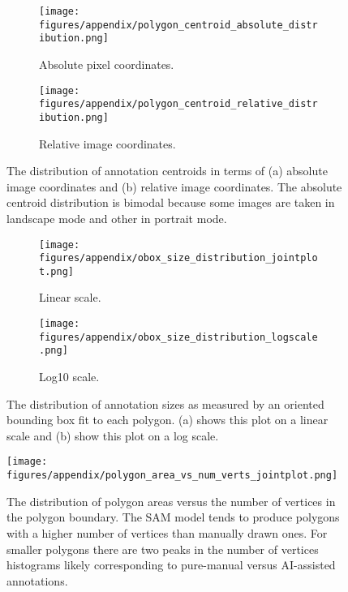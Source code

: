 \begin{figure}[ht]
\centering
\begin{subfigure}[b]{0.4\textwidth}
 \texttt{[image: figures/appendix/polygon\_centroid\_absolute\_distribution.png]}
 \caption{Absolute pixel coordinates.}
 \label{fig:centroid_abs}
\end{subfigure}
\hfill
\begin{subfigure}[b]{0.4\textwidth}
 \texttt{[image: figures/appendix/polygon\_centroid\_relative\_distribution.png]}
 \caption{Relative image coordinates.}
 \label{fig:centroid_rel}
\end{subfigure}
\caption{The distribution of annotation centroids in terms of (a) absolute image coordinates and (b) relative image coordinates. The absolute centroid distribution is bimodal because some images are taken in landscape mode and other in portrait mode.}
\label{fig:centroid_location_distri}
\end{figure}


\begin{figure}[ht]
\centering
\begin{subfigure}[b]{0.4\textwidth}
  \texttt{[image: figures/appendix/obox\_size\_distribution\_jointplot.png]}
  \caption{Linear scale.}
  \label{fig:annot_obox_size_dist_linear}
\end{subfigure}
\hfill
\begin{subfigure}[b]{0.4\textwidth}
  \texttt{[image: figures/appendix/obox\_size\_distribution\_logscale.png]}
  \caption{Log10 scale.}
  \label{fig:annot_obox_size_dist_log}
\end{subfigure}
\caption{The distribution of annotation sizes as measured by an oriented bounding box fit to each polygon. (a) shows this plot on a linear scale and (b) show this plot on a log scale.}
\label{fig:annot_obox_size_dist}
\end{figure}


\begin{figure}[ht]
\centering
\texttt{[image: figures/appendix/polygon\_area\_vs\_num\_verts\_jointplot.png]}
\caption[]{
    The distribution of polygon areas versus the number of vertices in the polygon boundary.
    The SAM model tends to produce polygons with a higher number of vertices
    than manually drawn ones.  For smaller polygons there are two peaks in the
    number of vertices histograms likely corresponding to pure-manual versus
    AI-assisted annotations.
}
\label{fig:annot_area_verts_distri}
\end{figure}

